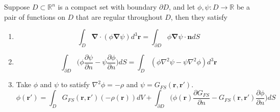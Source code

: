 \documentclass[a4paper]{article}
\begin{document}
\begin{prop}
Suppose $D\subset\mathbb{R}^n$ is a compact set with boundary $\partial D$, and let $\phi,\psi:D\rightarrow\mathbb{R}$ be a pair of functions on $D$ that are regular throughout $D$, then they satisfy
\begin{enumerate}
    \item 
    \begin{equation}
    \int_D\boldsymbol{\nabla}\cdot(\phi\boldsymbol{\nabla}\psi)d^3\mathbf{r}=\int_{\partial D}\phi\boldsymbol{\nabla}\psi\cdot\mathbf{n}dS\tag{10.15}
    \end{equation}
    \item 
    \begin{equation}
        \int_{\partial D}\bigg(\phi\frac{\partial\psi}{\partial n}-\psi\frac{\partial\phi}{\partial n}\bigg)dS=\int_D(\phi\nabla^2\psi-\psi\nabla^2\phi)d^3\mathbf{r}\tag{10.16}
    \end{equation}
    \item Take $\phi$ and $\psi$ to satisfy $\nabla^2\phi=-\rho$ and $\psi=G_{FS}(\mathbf{r},\mathbf{r'})$.
    \begin{equation}
        \phi(\mathbf{r'})=\int_DG_{FS}(\mathbf{r},\mathbf{r'})(-\rho(\mathbf{r}))dV+\int_{\partial D}\bigg(\phi(\mathbf{r})\frac{\partial G_{FS}}{\partial n}-G_{FS}(\mathbf{r},\mathbf{r'})\frac{\partial\phi}{\partial n}\bigg)dS\tag{10.17}
    \end{equation}
\end{enumerate}
\end{prop}
\end{document}

